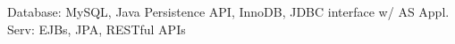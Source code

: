 Database: MySQL, Java Persistence API, InnoDB, JDBC interface w/ AS
Appl. Serv: EJBs, JPA, RESTful APIs